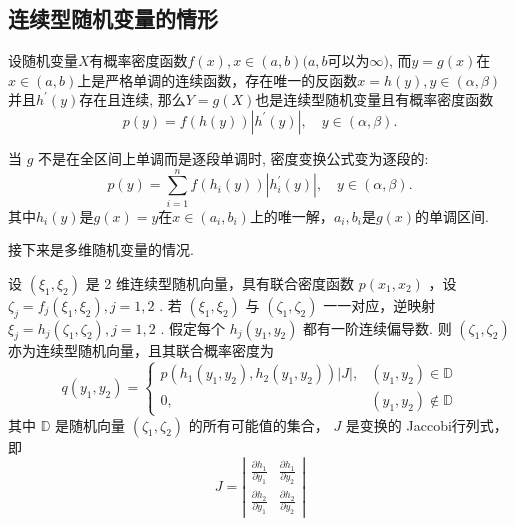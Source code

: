 \subsection{连续型随机变量的情形}

\begin{theorem}[密度变换公式]
    设随机变量$X$有概率密度函数$f(x),x\in(a,b)(a,b$可以为$\infty)$, 而$y=g(x)$在$x\in(a,b)$上是严格单调的连续函数，存在唯一的反函数$x=h(y),y\in(\alpha,\beta)$并且$h^{\prime}(y)$存在且连续, 那么$Y=g(X)$也是连续型随机变量且有概率密度函数
    $$
        p(y)=f(h(y))\left|h^{\prime}(y)\right|, \quad y\in(\alpha,\beta).
    $$
\end{theorem}

\begin{remark}
    当 $g$ 不是在全区间上单调而是逐段单调时, 密度变换公式变为逐段的:
    $$
        p(y)=\sum_{i=1}^n f(h_i(y))\left|h_i^{\prime}(y)\right|, \quad y\in(\alpha,\beta).
    $$
    其中$h_i(y)$是$g(x)=y$在$x\in(a_i,b_i)$上的唯一解，$a_i,b_i$是$g(x)$的单调区间.
\end{remark}
接下来是多维随机变量的情况.
\begin{theorem}[二维密度变换公式]\label{eq:two-dimensional_density_transform}
    设 $\left(\xi_1, \xi_2\right)$ 是 2 维连续型随机向量，具有联合密度函数 $p\left(x_1, x_2\right)$ ，设 $\zeta_j=f_j\left(\xi_1, \xi_2\right), j=1,2$ . 若 $\left(\xi_1, \xi_2\right)$ 与 $\left(\zeta_1, \zeta_2\right)$ 一一对应，逆映射 $\xi_j=h_j\left(\zeta_1, \zeta_2\right), j=1,2$ . 假定每个 $h_j\left(y_1, y_2\right)$ 都有一阶连续偏导数. 则 $\left(\zeta_1, \zeta_2\right)$ 亦为连续型随机向量，且其联合概率密度为
    $$
        q\left(y_1, y_2\right)=\left\{\begin{array}{cl}
            p\left(h_1\left(y_1, y_2\right), h_2\left(y_1, y_2\right)\right)|J|, & \left(y_1, y_2\right) \in \mathbb{D}    \\
            0,                                                                   & \left(y_1, y_2\right) \notin \mathbb{D}
        \end{array}\right.
    $$
    其中 $\mathbb{D}$ 是随机向量 $\left(\zeta_1, \zeta_2\right)$ 的所有可能值的集合， $J$ 是变换的 Jaccobi行列式，即
    $$
        J=\left|\begin{array}{ll}
            \frac{\partial h_1}{\partial y_1} & \frac{\partial h_1}{\partial y_2} \\
            \frac{\partial h_2}{\partial y_1} & \frac{\partial h_2}{\partial y_2}
        \end{array}\right|
    $$
\end{theorem}

